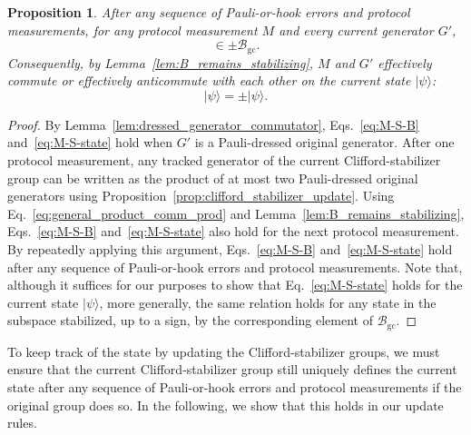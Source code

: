 \documentclass[
 reprint,
 amsmath,amssymb,
 pra,superscriptaddress, nofootinbib
]{revtex4-2}
\newtheorem{proposition}{Proposition}
\theoremstyle{definition}
\theoremstyle{plain}
\begin{document}
\begin{proposition}
\label{prop:commute_anticommute}
After any sequence of Pauli-or-hook errors and protocol measurements, for any protocol measurement $M$ and every current generator $G'$,
\begin{equation}
  [M,G']\in\pm\mathcal{B}_{\mathrm{gc}}.
  \label{eq:M-S-B}
\end{equation}
Consequently, by Lemma~\ref{lem:B_remains_stabilizing}, $M$ and $G'$ effectively commute or effectively anticommute with each other on the current state $|\psi\rangle$:
\begin{equation}
  [M,G']|\psi\rangle=\pm|\psi\rangle.
  \label{eq:M-S-state}
\end{equation}
\end{proposition}

\begin{proof}
By Lemma~\ref{lem:dressed_generator_commutator}, Eqs.~\eqref{eq:M-S-B} and~\eqref{eq:M-S-state} hold when $G'$ is a Pauli-dressed original generator. After one protocol measurement, any tracked generator of the current Clifford-stabilizer group can be written as the product of at most two Pauli-dressed original generators using Proposition~\ref{prop:clifford_stabilizer_update}.
Using Eq.~\eqref{eq:general_product_comm_prod} and Lemma~\ref{lem:B_remains_stabilizing}, Eqs.~\eqref{eq:M-S-B} and~\eqref{eq:M-S-state} also hold for the next protocol measurement. By repeatedly applying this argument, Eqs.~\eqref{eq:M-S-B} and~\eqref{eq:M-S-state} hold after any sequence of Pauli-or-hook errors and protocol measurements.
Note that, although it suffices for our purposes to show that Eq.~\eqref{eq:M-S-state} holds for the current state $|\psi\rangle$, more generally, the same relation holds for any state in the subspace stabilized, up to a sign, by the corresponding element of $\mathcal{B}_{\mathrm{gc}}$.
\end{proof}

To keep track of the state by updating the Clifford-stabilizer groups, we must ensure that the current Clifford-stabilizer group still uniquely defines the current state after any sequence of Pauli-or-hook errors and protocol measurements if the original group does so. In the following, we show that this holds in our update rules.
\end{document}

